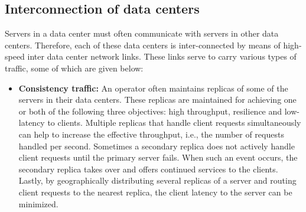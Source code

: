 \subsection{Interconnection of data centers} Servers in a data center must often communicate with servers in other data centers. Therefore, each of these data centers is inter-connected by means of high-speed inter data center network links. These links serve to carry various types of traffic, some of which are given below:
\begin{itemize}
\item \textbf{Consistency traffic:} An operator often maintains replicas of some of the servers in their data centers. These replicas are maintained for achieving one or both of the following three objectives: high throughput, resilience and low-latency to clients. Multiple replicas that handle client requests simultaneously can help to increase the effective throughput, i.e., the number of requests handled per second. Sometimes a secondary replica does not actively handle client requests until the primary server fails. When such an event occurs, the secondary replica takes over and offers continued services to the clients. Lastly, by geographically distributing several replicas of a server and routing client requests to the nearest replica, the client latency to the server can be minimized. 


\end{itemize}
